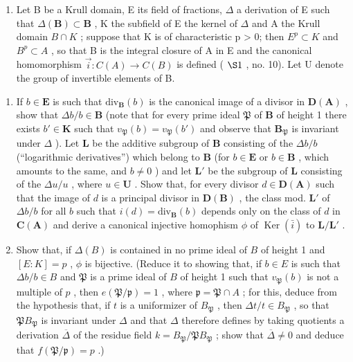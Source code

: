 \begin{enumerate}
\def\labelenumi{\arabic{enumi}.}
\setcounter{enumi}{22}
\tightlist
\item
  Let B be a Krull domain, E its field of fractions, \(\Delta\) a derivation of E such that \(\Delta(\mathbf{B}) \subset \mathbf{B}\) , K the subfield of E the kernel of \(\Delta\) and A the Krull domain \(B \cap K\) ; suppose that K is of characteristic p \textgreater{} 0; then \(E^{p} \subset K\) and \(B^{p} \subset A\) , so that B is the integral closure of A in E and the canonical homomorphism \(\vec{i}: C(A) \to C(B)\) is defined ( \(\S 1\) , no. 10). Let U denote the group of invertible elements of B.
\end{enumerate}

\begin{enumerate}
\def\labelenumi{(\alph{enumi})}
\item
  If \(b \in \mathbf{E}\) is such that \(\mathrm{div}_{\mathbf{B}}(b)\) is the canonical image of a divisor in \(\mathbf{D}(\mathbf{A})\) , show that \(\Delta b / b \in \mathbf{B}\) (note that for every prime ideal \(\mathfrak{P}\) of \(\mathbf{B}\) of height 1 there exists \(b' \in \mathbf{K}\) such that \(v_{\mathfrak{P}}(b) = v_{\mathfrak{P}}(b')\) and observe that \(\mathbf{B}_{\mathfrak{P}}\) is invariant under \(\Delta\) ). Let \(\mathbf{L}\) be the additive subgroup of \(\mathbf{B}\) consisting of the \(\Delta b / b\) (``logarithmic derivatives'') which belong to \(\mathbf{B}\) (for \(b \in \mathbf{E}\) or \(b \in \mathbf{B}\) , which amounts to the same, and \(b \neq 0\) ) and let \(\mathbf{L}'\) be the subgroup of \(\mathbf{L}\) consisting of the \(\Delta u / u\) , where \(u \in \mathbf{U}\) . Show that, for every divisor \(d \in \mathbf{D}(\mathbf{A})\) such that the image of \(d\) is a principal divisor in \(\mathbf{D}(\mathbf{B})\) , the class mod. \(\mathbf{L}'\) of \(\Delta b / b\) for all \(b\) such that \(i(d) = \mathrm{div}_{\mathbf{B}}(b)\) depends only on the class of \(d\) in \(\mathbf{C}(\mathbf{A})\) and derive a canonical injective homophism \(\phi\) of \(\operatorname{Ker}(\bar{i})\) to \(\mathbf{L} / \mathbf{L}'\) .
\item
  Show that, if \(\Delta(B)\) is contained in no prime ideal of \(B\) of height 1 and \([E: K] = p\) , \(\phi\) is bijective. (Reduce it to showing that, if \(b \in E\) is such that \(\Delta b / b \in B\) and \(\mathfrak{P}\) is a prime ideal of \(B\) of height 1 such that \(v_{\mathfrak{P}}(b)\) is not a multiple of \(p\) , then \(e(\mathfrak{P} / \mathfrak{p}) = 1\) , where \(\mathfrak{p} = \mathfrak{P} \cap A\) ; for this, deduce from the hypothesis that, if \(t\) is a uniformizer of \(B_{\mathfrak{P}}\) , then \(\Delta t / t \in B_{\mathfrak{P}}\) , so that \(\mathfrak{P}B_{\mathfrak{P}}\) is invariant under \(\Delta\) and that \(\Delta\) therefore defines by taking quotients a derivation \(\overline{\Delta}\) of the residue field \(k = B_{\mathfrak{P}} / \mathfrak{P}B_{\mathfrak{P}}\) ; show that \(\overline{\Delta} \neq 0\) and deduce that \(f(\mathfrak{P} / \mathfrak{p}) = p\) .)

\end{enumerate}
